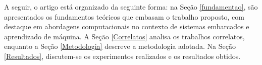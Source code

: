 A seguir, o artigo está organizado da seguinte forma: na Seção \ref{fundamentao}, são apresentados os fundamentos teóricos que embasam o trabalho proposto, com destaque em abordagens computacionais no contexto de sistemas embarcados e aprendizado de máquina. A Seção \ref{Correlatos} analisa os trabalhos correlatos, enquanto a Seção \ref{Metodologia} descreve a metodologia adotada. Na Seção \ref{Resultados}, discutem-se os experimentos realizados e os resultados obtidos.